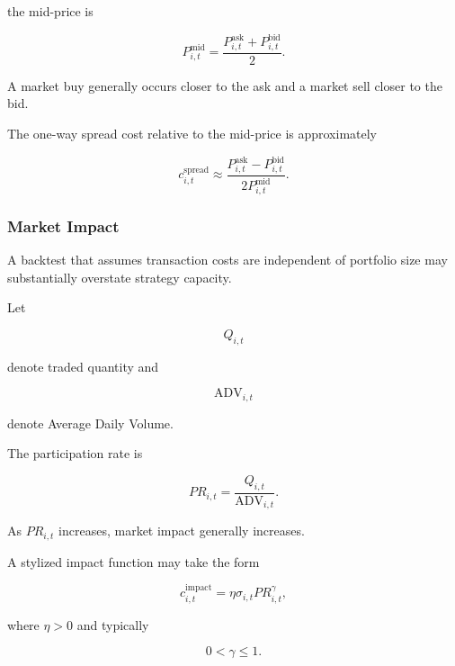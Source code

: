 \documentclass[11pt,a4paper]{article}
\begin{document}
the mid-price is

\begin{equation}
P_{i,t}^{\mathrm{mid}}
=
\frac{
P_{i,t}^{\mathrm{ask}}
+
P_{i,t}^{\mathrm{bid}}
}{2}.
\end{equation}

A market buy generally occurs closer to the ask and a market sell closer to the
bid.

The one-way spread cost relative to the mid-price is approximately

\begin{equation}
c_{i,t}^{\mathrm{spread}}
\approx
\frac{
P_{i,t}^{\mathrm{ask}}
-
P_{i,t}^{\mathrm{bid}}
}{
2P_{i,t}^{\mathrm{mid}}
}.
\end{equation}


\subsubsection{Market Impact}

A backtest that assumes transaction costs are independent of portfolio size may
substantially overstate strategy capacity.

Let

\begin{equation}
Q_{i,t}
\end{equation}

denote traded quantity and

\begin{equation}
\mathrm{ADV}_{i,t}
\end{equation}

denote Average Daily Volume.

The participation rate is

\begin{equation}
\boxed{
PR_{i,t}
=
\frac{
Q_{i,t}
}{
\mathrm{ADV}_{i,t}
}.
}
\end{equation}

As $PR_{i,t}$ increases, market impact generally increases.

A stylized impact function may take the form

\begin{equation}
c_{i,t}^{\mathrm{impact}}
=
\eta
\sigma_{i,t}
PR_{i,t}^{\gamma},
\end{equation}

where $\eta>0$ and typically

\begin{equation}
0<\gamma\leq 1.
\end{equation}
\end{document}
